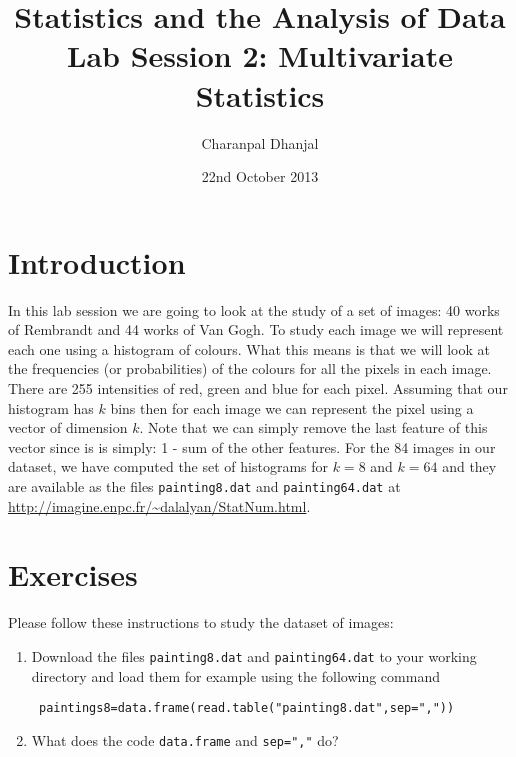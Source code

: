 \documentclass[a4paper,10pt]{article}
\title{Statistics and the Analysis of Data\\ Lab Session 2: Multivariate Statistics}
\author{Charanpal Dhanjal}
\begin{document}
\date{22nd October 2013}
\maketitle

\section{Introduction} 

In this lab session we are going to look at the study of a set of images: 40 works of Rembrandt and 44 works of Van Gogh. To study each image we will represent each one using a histogram of colours. What this means is that we will look at the frequencies (or probabilities) of the colours for all the pixels in each image. There are 255 intensities of red, green and blue for each pixel. Assuming that our histogram has $k$ bins then for each image we can represent the pixel using a vector of dimension $k$. Note that we can simply remove the last feature of this vector since is is simply:  1 - sum of the other features. For the 84 images in our dataset, we have computed the set of histograms for $k=8$ and $k=64$ and they are available as the files \texttt{painting8.dat} and \texttt{painting64.dat} at \url{http://imagine.enpc.fr/~dalalyan/StatNum.html}. 

\section{Exercises} 

Please follow these instructions to study the dataset of images: 

\begin{enumerate} 
 \item Download the files \texttt{painting8.dat} and \texttt{painting64.dat} to your working directory and load them for example using the following command 
\begin{lstlisting} 
 paintings8=data.frame(read.table("painting8.dat",sep=","))
\end{lstlisting}
\item What does the code \texttt{data.frame} and \texttt{sep=","} do? 
\end{enumerate}
\end{document}
